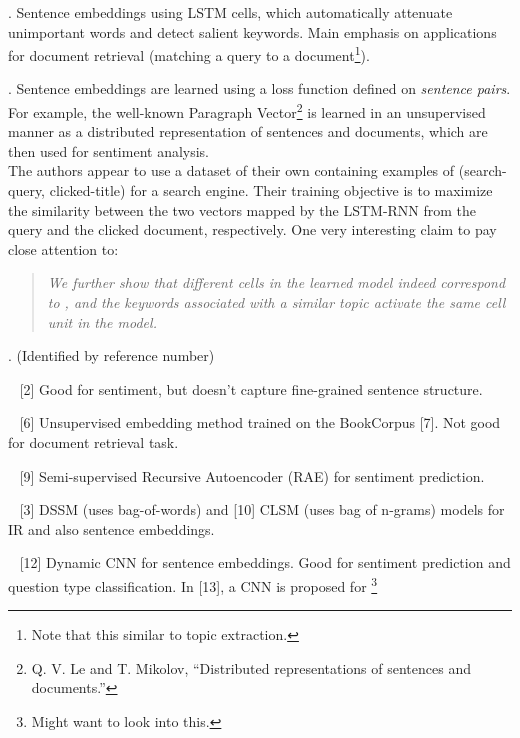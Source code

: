 \documentclass[11pt]{article}
\newcommand\myspace[1][]{\vspace{#1\bigskipamount}}
\newcommand\p{\Needspace{10\baselineskip} \noindent}
\begin{document}
\p {}. Sentence embeddings using LSTM cells, which automatically attenuate unimportant words and detect salient keywords. Main emphasis on applications for document retrieval (matching a query to a document\footnote{Note that this similar to topic extraction.}).

\myspace
\p {}. Sentence embeddings are learned using a loss function defined on \textit{sentence pairs}. For example, the well-known Paragraph Vector\footnote{Q. V. Le and T. Mikolov, “Distributed representations of sentences and documents.”} is learned in an unsupervised manner as a distributed representation of sentences and documents, which are then used for sentiment analysis. \\

\p The authors appear to use a dataset of their own containing examples of (search-query, clicked-title) for a search engine. Their training objective is to maximize the similarity between the two vectors mapped by the LSTM-RNN from the query and the clicked document, respectively. One very interesting claim to pay close attention to:
\vspace{-1em}
\begin{quote}
	{\small \textit{We further show that different cells in the learned model indeed correspond to , and the keywords associated with a similar topic activate the same cell unit in the model.} }
\end{quote}

\myspace
\p {}. (Identified by reference number)
\begin{compactitem}
	\item ~ [2] Good for sentiment, but doesn't capture fine-grained sentence structure.
	
	\item ~ [6] Unsupervised embedding method trained on the BookCorpus [7]. Not good for document retrieval task.
	
	\item ~ [9] Semi-supervised Recursive Autoencoder (RAE) for sentiment prediction.
	
	\item ~ [3] DSSM (uses bag-of-words) and [10] CLSM (uses bag of n-grams) models for IR and also sentence embeddings.
	
	\item ~ [12] Dynamic CNN for sentence embeddings. Good for sentiment prediction and question type classification. In [13], a CNN is proposed for \footnote{Might want to look into this.}
\end{compactitem}
\end{document}
